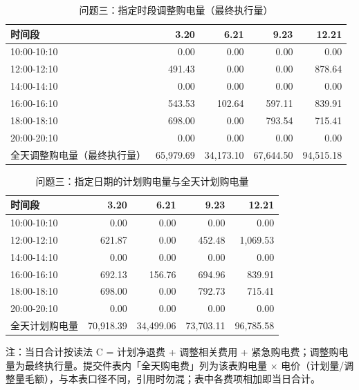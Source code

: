 \begin{table}[htbp]
\centering
\caption{问题三：指定时段调整购电量（最终执行量）}
\label{tab:q3-a1b}
\small
\setlength{\tabcolsep}{4pt}
\begin{tabular}{lrrrr}
\toprule
时间段 & 3.20 & 6.21 & 9.23 & 12.21 \\
\midrule
10:00-10:10 & 0.00 & 0.00 & 0.00 & 0.00 \\
12:00-12:10 & 491.43 & 0.00 & 0.00 & 878.64 \\
14:00-14:10 & 0.00 & 0.00 & 0.00 & 0.00 \\
16:00-16:10 & 543.53 & 102.64 & 597.11 & 839.91 \\
18:00-18:10 & 698.00 & 0.00 & 793.54 & 715.41 \\
20:00-20:10 & 0.00 & 0.00 & 0.00 & 0.00 \\
全天调整购电量（最终执行量） & 65,979.69 & 34,173.10 & 67,644.50 & 94,515.18 \\
\bottomrule
\end{tabular}
\end{table}
\begin{table}[htbp]
\centering
\caption{问题三：指定日期的计划购电量与全天计划购电量}
\label{tab:q3-a}
\small
\setlength{\tabcolsep}{4pt}
\begin{tabular}{lrrrr}
\toprule
时间段 & 3.20 & 6.21 & 9.23 & 12.21 \\
\midrule
10:00-10:10 & 0.00 & 0.00 & 0.00 & 0.00 \\
12:00-12:10 & 621.87 & 0.00 & 452.48 & 1,069.53 \\
14:00-14:10 & 0.00 & 0.00 & 0.00 & 0.00 \\
16:00-16:10 & 692.13 & 156.76 & 694.96 & 839.91 \\
18:00-18:10 & 698.00 & 0.00 & 792.73 & 715.41 \\
20:00-20:10 & 0.00 & 0.00 & 0.00 & 0.00 \\
全天计划购电量 & 70,918.39 & 34,499.06 & 73,703.11 & 96,785.58 \\
\bottomrule
\end{tabular}
\vspace{2pt}
\begin{flushleft}\footnotesize 注：当日合计按读法 C = 计划净退费 + 调整相关费用 + 紧急购电费；调整购电量为最终执行量。提交件表内「全天购电费」列为该表购电量 × 电价（计划量/调整量毛额），与本表口径不同，引用时勿混；表中各费项相加即当日合计。\end{flushleft}
\end{table}
